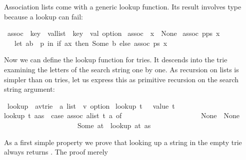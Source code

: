 \begin{isabellebody}
\begin{isamarkuptext}%
\noindent
Association lists come with a generic lookup function.  Its result
involves type  because a lookup can fail:%
\end{isamarkuptext}%
\isamarkuptrue%
\isamarkupfalse%
\ assoc\ {\isacharcolon}{\isacharcolon}\ {\isachardoublequoteopen}{\isacharparenleft}{\isacharprime}key\ {\isacharasterisk}\ {\isacharprime}val{\isacharparenright}list\ {\isasymRightarrow}\ {\isacharprime}key\ {\isasymRightarrow}\ {\isacharprime}val\ option{\isachardoublequoteclose}\ \isanewline
{\isachardoublequoteopen}assoc\ {\isacharbrackleft}{\isacharbrackright}\ x\ {\isacharequal}\ None{\isachardoublequoteclose}\ {\isacharbar}\isanewline
{\isachardoublequoteopen}assoc\ {\isacharparenleft}p{\isacharhash}ps{\isacharparenright}\ x\ {\isacharequal}\isanewline
\ \ \ {\isacharparenleft}let\ {\isacharparenleft}a{\isacharcomma}b{\isacharparenright}\ {\isacharequal}\ p\ in\ if\ a{\isacharequal}x\ then\ Some\ b\ else\ assoc\ ps\ x{\isacharparenright}{\isachardoublequoteclose}%
\begin{isamarkuptext}%
Now we can define the lookup function for tries. It descends into the trie
examining the letters of the search string one by one. As
recursion on lists is simpler than on tries, let us express this as primitive
recursion on the search string argument:%
\end{isamarkuptext}%
\isamarkuptrue%
\isamarkupfalse%
\ lookup\ {\isacharcolon}{\isacharcolon}\ {\isachardoublequoteopen}{\isacharparenleft}{\isacharprime}a{\isacharcomma}{\isacharprime}v{\isacharparenright}trie\ {\isasymRightarrow}\ {\isacharprime}a\ list\ {\isasymRightarrow}\ {\isacharprime}v\ option{\isachardoublequoteclose}\ \isanewline
{\isachardoublequoteopen}lookup\ t\ {\isacharbrackleft}{\isacharbrackright}\ {\isacharequal}\ value\ t{\isachardoublequoteclose}\ {\isacharbar}\isanewline
{\isachardoublequoteopen}lookup\ t\ {\isacharparenleft}a{\isacharhash}as{\isacharparenright}\ {\isacharequal}\ {\isacharparenleft}case\ assoc\ {\isacharparenleft}alist\ t{\isacharparenright}\ a\ of\isanewline
\ \ \ \ \ \ \ \ \ \ \ \ \ \ \ \ \ \ \ \ \ \ None\ {\isasymRightarrow}\ None\isanewline
\ \ \ \ \ \ \ \ \ \ \ \ \ \ \ \ \ \ \ \ {\isacharbar}\ Some\ at\ {\isasymRightarrow}\ lookup\ at\ as{\isacharparenright}{\isachardoublequoteclose}%
\begin{isamarkuptext}%
As a first simple property we prove that looking up a string in the empty
trie  always returns . The proof merely

\end{isamarkuptext}
\end{isabellebody}
